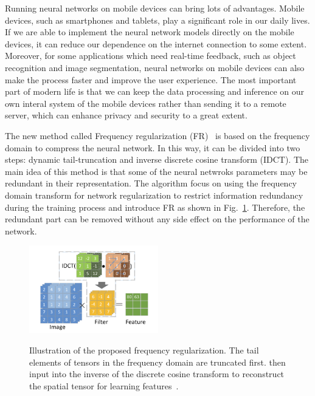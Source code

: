 \documentclass{article}
\begin{document}
Running neural networks on mobile devices can bring lots of advantages. Mobile devices, such as smartphones and tablets, play a significant role in our daily lives. If we are able to implement the neural network models directly on the mobile devices, it can reduce our dependence on the internet connection to some extent. Moreover, for some applications which need real-time feedback, such as object recognition and image segmentation, neural networks on mobile devices can also make the process faster and improve the user experience. The most important part of modern life is that we can keep the data processing and inference on our own interal system of the mobile devices rather than sending it to a remote server, which can enhance privacy and security to a great extent.

The new method called Frequency regularization (FR)~\cite{zhao2023frequency} is based on the frequency domain to compress the neural network. In this way, it can be divided into two steps: dynamic tail-truncation and inverse discrete cosine transform (IDCT). The main idea of this method is that some of the neural netwroks parameters may be redundant in their representation. The algorithm focus on using the frequency domain transform for network regularization to restrict information redundancy during the training process and introduce FR as shown in Fig.~\ref{idct}. Therefore, the redundant part can be removed without any side effect on the performance of the network.

\begin{figure}
	\vspace{-15pt}    %
	\includegraphics[width=0.5\textwidth]{figure/idct.png}\\
	\vspace{-15pt}    %
	\caption{Illustration of the proposed frequency regularization. The tail elements of tensors in the frequency domain are truncated first. then input into the inverse of the discrete cosine transform to reconstruct the spatial tensor for learning features~\cite{zhao2023frequency}.}
	\label{idct}
	\vspace{-15pt}    %
\end{figure}
\end{document}
